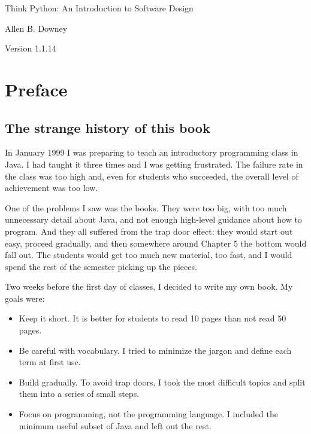 \documentclass[10pt]{book}
\newcommand{\thetitle}{Think Python: An Introduction to Software Design}
\newcommand{\theversion}{1.1.14}
\begin{document}

\begin{htmlonly}


{\Large \thetitle}

{\large Allen B. Downey}

Version \theversion

\setcounter{chapter}{-1}

\end{htmlonly}

\chapter{Preface}

\section*{The strange history of this book}

In January 1999 I was preparing to teach an introductory programming
class in Java.  I had taught it three times and I was getting
frustrated.  The failure rate in the class was too high and, even for
students who succeeded, the overall level of achievement was too low.

One of the problems I saw was the books.  
They were too big, with too much unnecessary detail about Java, and
not enough high-level guidance about how to program.  And they all
suffered from the trap door effect: they would start out easy,
proceed gradually, and then somewhere around Chapter 5 the bottom would
fall out.  The students would get too much new material, too fast,
and I would spend the rest of the semester picking up the pieces.

Two weeks before the first day of classes, I decided to write my
own book.  
My goals were:

\begin{itemize}

\item Keep it short.  It is better for students to read 10 pages
than not read 50 pages.

\item Be careful with vocabulary.  I tried to minimize the jargon
and define each term at first use.

\item Build gradually. To avoid trap doors, I took the most difficult
topics and split them into a series of small steps. 

\item Focus on programming, not the programming language.  I included
the minimum useful subset of Java and left out the rest.

\end{itemize}
\end{document}
